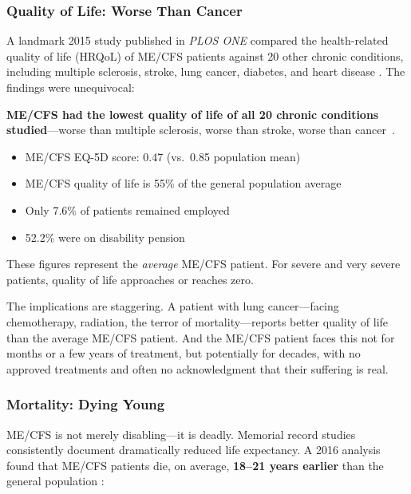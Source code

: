 \subsubsection{Quality of Life: Worse Than Cancer}
\label{subsec:qol-comparison}

A landmark 2015 study published in \textit{PLOS ONE} compared the health-related quality of life (HRQoL) of ME/CFS patients against 20 other chronic conditions, including multiple sclerosis, stroke, lung cancer, diabetes, and heart disease \cite{hvidberg2015quality}. The findings were unequivocal:

\begin{observation}
\label{obs:qol-comparison}
\textbf{ME/CFS had the lowest quality of life of all 20 chronic conditions studied}---worse than multiple sclerosis, worse than stroke, worse than cancer~\cite{hvidberg2015quality}.

\begin{itemize}
    \item ME/CFS EQ-5D score: 0.47 (vs.\ 0.85 population mean)
    \item ME/CFS quality of life is 55\% of the general population average
    \item Only 7.6\% of patients remained employed
    \item 52.2\% were on disability pension
\end{itemize}

These figures represent the \textit{average} ME/CFS patient. For severe and very severe patients, quality of life approaches or reaches zero.
\end{observation}

The implications are staggering. A patient with lung cancer---facing chemotherapy, radiation, the terror of mortality---reports better quality of life than the average ME/CFS patient. And the ME/CFS patient faces this not for months or a few years of treatment, but potentially for decades, with no approved treatments and often no acknowledgment that their suffering is real.

\subsubsection{Mortality: Dying Young}
\label{subsec:mortality}

ME/CFS is not merely disabling---it is deadly. Memorial record studies consistently document dramatically reduced life expectancy. A 2016 analysis found that ME/CFS patients die, on average, \textbf{18--21 years earlier} than the general population \cite{McManimen2016}:

